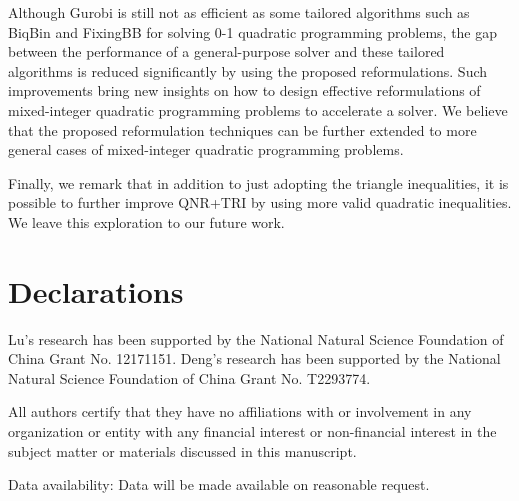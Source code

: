 \documentclass[pdflatex,sn-mathphys-num]{sn-jnl}%
\theoremstyle{thmstyleone}%
\theoremstyle{thmstyletwo}%
\theoremstyle{thmstylethree}%
\begin{document}
Although Gurobi is still not as efficient as some tailored algorithms such as BiqBin and FixingBB for solving 0-1 quadratic programming problems, the gap between the performance of a general-purpose solver and these tailored algorithms is reduced significantly by using the proposed reformulations. Such improvements bring new insights on how to design effective reformulations of mixed-integer quadratic programming problems to accelerate a solver. We believe that the proposed reformulation techniques can be further extended to more general cases of mixed-integer quadratic programming problems.

Finally, we remark that in addition to just adopting the triangle inequalities, it is possible to further improve QNR+TRI by using more valid quadratic inequalities. We leave this exploration to our future work.



\section*{Declarations}

Lu's research has been supported by the National Natural Science Foundation of China Grant No. 12171151. Deng's research has been supported by the National Natural Science Foundation of China Grant No. T2293774.

All authors certify that they have no affiliations with or involvement in any organization or entity with any financial interest or non-financial interest in the subject matter or materials discussed in this manuscript.

Data availability: Data will be made available on reasonable request.



\end{document}
